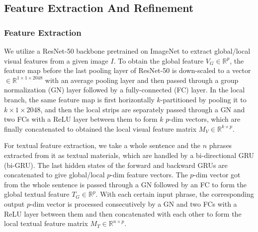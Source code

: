\documentclass[sigconf]{acmart}
\begin{document}
\subsection{Feature Extraction And Refinement}
\label{sec:feature_extraction}
\subsubsection{Feature Extraction}
We utilize a ResNet-50 \cite{ResNet} backbone pretrained on ImageNet to extract global/local visual features from a given image $I$. To obtain the global feature $V_{G} \in \mathbb{R}^{p}$, the feature map before the last pooling layer of ResNet-50 is down-scaled to a vector $\in \mathbb{R}^{1 \times 1 \times 2048}$ with an average pooling layer and then passed through a group normalization (GN) layer followed by a fully-connected (FC) layer. In the local branch, the same feature map is first horizontally $k$-partitioned by pooling it to $k \times 1 \times 2048$, and then the local strips are separately passed through a GN and two FCs with a ReLU layer between them to form $k$ $p$-dim vectors, which are finally concatenated to obtained the local visual feature matrix $M_{V} \in \mathbb{R}^{k \times p}$.

For textual feature extraction, we take a whole sentence and the $n$ phrases extracted from it as textual materials, which are handled by a bi-directional GRU (bi-GRU). The last hidden states of the forward and backward GRUs are concatenated to give global/local $p$-dim feature vectors. The $p$-dim vector got from the whole sentence is passed through a GN followed by an FC to form the global textual feature $T_{G} \in \mathbb{R}^{p}$. With each certain input phrase, the corresponding output $p$-dim vector is processed consecutively by a GN and two FCs with a ReLU layer between them and then concatenated with each other to form the local textual feature matrix $M_{T} \in \mathbb{R}^{n \times p}$.
\end{document}

